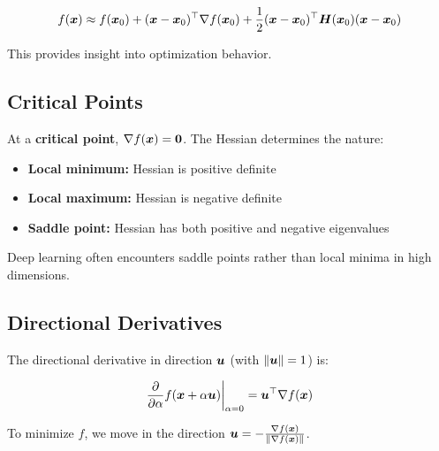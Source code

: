 \begin{equation}
f(\boldsymbol{x}) \approx f(\boldsymbol{x}_0) + (\boldsymbol{x} - \boldsymbol{x}_0)^\top \nabla f(\boldsymbol{x}_0) + \frac{1}{2}(\boldsymbol{x} - \boldsymbol{x}_0)^\top \boldsymbol{H}(\boldsymbol{x}_0) (\boldsymbol{x} - \boldsymbol{x}_0)
\end{equation}

This provides insight into optimization behavior.

\subsection{Critical Points}

At a \textbf{critical point}, $\nabla f(\boldsymbol{x}) = \boldsymbol{0}$. The Hessian determines the nature:
\begin{itemize}
    \item \textbf{Local minimum:} Hessian is positive definite
    \item \textbf{Local maximum:} Hessian is negative definite
    \item \textbf{Saddle point:} Hessian has both positive and negative eigenvalues
\end{itemize}

Deep learning often encounters saddle points rather than local minima in high dimensions.

\subsection{Directional Derivatives}

The directional derivative in direction $\boldsymbol{u}$ (with $\|\boldsymbol{u}\| = 1$) is:

\begin{equation}
\frac{\partial}{\partial \alpha} f(\boldsymbol{x} + \alpha \boldsymbol{u}) \bigg|_{\alpha=0} = \boldsymbol{u}^\top \nabla f(\boldsymbol{x})
\end{equation}

To minimize $f$, we move in the direction $\boldsymbol{u} = -\frac{\nabla f(\boldsymbol{x})}{\|\nabla f(\boldsymbol{x})\|}$.
